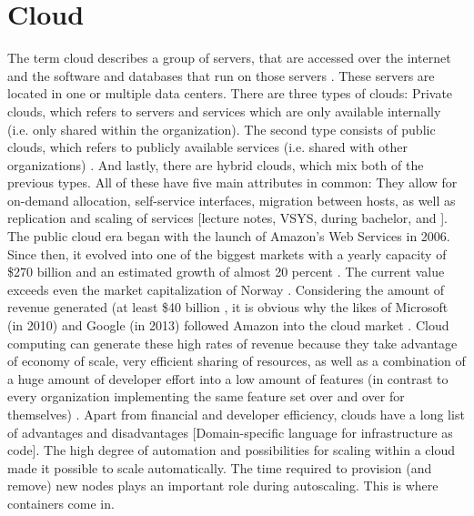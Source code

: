 \section{Cloud}
The term cloud describes a group of servers, that are accessed over the internet and the software and databases that run on those servers \cite{cloudflare_what_is_cloud}. These servers are located in one or multiple data centers. There are three types of clouds: Private clouds, which refers to servers and services which are only available internally (i.e. only shared within the organization). The second type consists of public clouds, which refers to publicly available services (i.e. shared with other organizations) \cite{cloudflare_what_is_private_cloud}. And lastly, there are hybrid clouds, which mix both of the previous types. All of these have five main attributes in common: They allow for on-demand allocation, self-service interfaces, migration between hosts, as well as replication and scaling of services [lecture notes, VSYS, during bachelor, and \cite{microsoft_what_is_private_cloud}].
\newline
The public cloud era began with the launch of Amazon's Web Services in 2006. Since then, it evolved into one of the biggest markets with a yearly capacity of \$270 billion and an estimated growth of almost 20 percent \cite{gartner_forecast_cloud_spending}. The current value exceeds even the market capitalization of Norway \cite{indexmundi_ranking}. Considering the amount of revenue generated (at least \$40 billion \cite{indexmundi_ranking}, it is obvious why the likes of Microsoft (in 2010) and Google (in 2013) followed Amazon into the cloud market \cite{cbinsights_multi_cloud_strategies}.
\newline
Cloud computing can generate these high rates of revenue because they take advantage of economy of scale, very efficient sharing of resources, as well as a combination of a huge amount of developer effort into a low amount of features (in contrast to every organization implementing the same feature set over and over for themselves) \cite{forbes_cloud_economy_scale}.
\newline
Apart from financial and developer efficiency, clouds have a long list of advantages and disadvantages [Domain-specific language for infrastructure as code]. %
\newline
The high degree of automation and possibilities for scaling within a cloud made it possible to scale automatically. The time required to provision (and remove) new nodes plays an important role during autoscaling. This is where containers come in.

